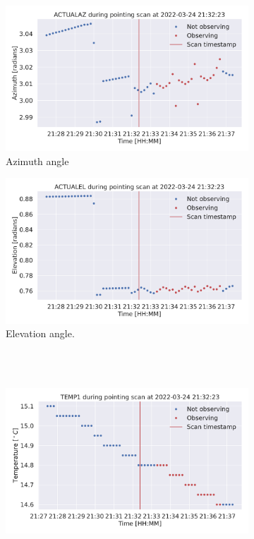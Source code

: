 \begin{figure}[H]
    \centering
    \begin{subfigure}[t]{0.49\textwidth}
        \centering
        \includegraphics[width=\textwidth]{Feature during scans/scan_ACTUALAZ_335.pdf}
        \caption{Azimuth angle}
        \label{subfig:scan_az}
    \end{subfigure}
    \begin{subfigure}[t]{0.49\textwidth}
       \centering
       \includegraphics[width=1\textwidth]{Feature during scans/scan_ACTUALEL_335.pdf}
       \caption{Elevation angle.}
       \label{subfig:scan_el}
    \end{subfigure}
    \\~\\
    \begin{subfigure}[t]{0.49\textwidth}
        \centering
        \includegraphics[width=\textwidth]{Feature during scans/scan_TEMP1_335.pdf}

\end{subfigure}
\end{figure}
